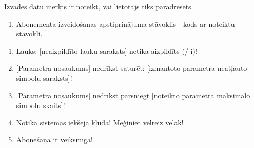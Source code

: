 {
	Izvades datu mērķis ir noteikt, vai lietotājs tiks pāradresēts.
	\begin{enumerate}
		\item Abonementa izveidošanas apstiprinājuma stāvoklis - kods ar noteiktu stāvokli.
	\end{enumerate}
}
{
	\begin{enumerate}
		\item Lauks: [neaizpildīto lauku saraksts] netika aizpildīts (/-i)!
		\item {}[Parametra nosaukums] nedrīkst saturēt: [izmantoto parametra neatļauto simbolu saraksts]!
		\item {}[Parametra nosaukums] nedrīkst pārsniegt [noteikto parametra maksimālo simbolu skaits]!
		\item Notika sistēmas iekšējā kļūda! Mēģiniet vēlreiz vēlāk!
		\item Abonēšana ir veiksmīga!
	\end{enumerate}
}
